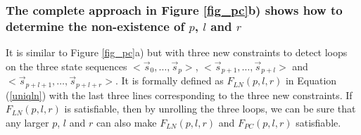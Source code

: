 \documentclass[conference]{IEEEtran}
\begin{document}


% 
% 
% 



\subsubsection{The complete approach in Figure \ref{fig_pc}b) shows how to determine the non-existence of $p$, $l$ and $r$}\label{subsub_complete}

It is similar to Figure \ref{fig_pc}a) but with three new constraints to detect loops 
on the three state sequences $<\vec{s}_{0},\dots,\vec{s}_{p}>$, $<\vec{s}_{p+1},\dots,\vec{s}_{p+l}>$ and 
$<\vec{s}_{p+l+1},\dots,\vec{s}_{p+l+r}>$.
It is formally defined as $F_{LN}(p,l,r)$ in Equation (\ref{uniqln}) 
with the last three lines corresponding to the three new constraints.
If $F_{LN}(p,l,r)$ is satisfiable,
then by unrolling the three loops,
we can be sure that any larger  $p$, $l$ and $r$ can also make $F_{LN}(p,l,r)$ and $F_{PC}(p,l,r)$ satisfiable.
\end{document}
